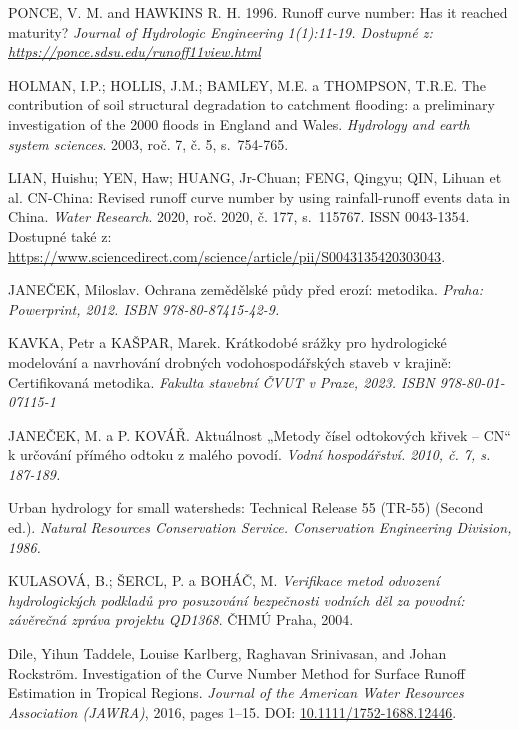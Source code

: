 \documentclass[a4paper,oneside,12pt]{book}
\begin{document}
\begin{thebibliography}{1}
PONCE, V. M. and HAWKINS R. H. 1996. Runoff curve number: Has it reached maturity?
\textit{ Journal of Hydrologic Engineering 1(1):11-19. Dostupné z: \href{https://ponce.sdsu.edu/runoff11view.html}
{https://ponce.sdsu.edu/runoff11view.html}}

HOLMAN, I.P.; HOLLIS, J.M.; BAMLEY, M.E. a THOMPSON, T.R.E. The contribution of soil structural degradation to catchment flooding: a preliminary investigation of the 2000 floods in England and Wales. \textit{Hydrology and earth system sciences}. 2003, roč. 7, č. 5, s.~754-765.

LIAN, Huishu; YEN, Haw; HUANG, Jr-Chuan; FENG, Qingyu; QIN, Lihuan et al. CN-China: Revised runoff curve number by using rainfall-runoff events data in China. \textit{Water Research}. 2020, roč. 2020, č. 177, s.~115767. ISSN 0043-1354. Dostupné také z: \url{https://www.sciencedirect.com/science/article/pii/S0043135420303043}.

JANEČEK, Miloslav. Ochrana zemědělské půdy před erozí: metodika.
\textit{ Praha: Powerprint, 2012. ISBN 978-80-87415-42-9. }

KAVKA, Petr a KAŠPAR, Marek. Krátkodobé srážky pro hydrologické modelování a navrhování drobných vodohospodářských staveb v krajině: Certifikovaná metodika.
\textit{ Fakulta stavební ČVUT v Praze, 2023. ISBN 978-80-01-07115-1}

JANEČEK, M. a P. KOVÁŘ. Aktuálnost „Metody čísel odtokových křivek –
CN“ k určování přímého odtoku z malého povodí.
\textit{ Vodní hospodářství. 2010,
č. 7, s. 187-189.} 

Urban hydrology for small watersheds: Technical Release 55 (TR-55) (Second ed.).
\textit{ Natural Resources Conservation Service. Conservation Engineering Division, 1986.}

KULASOVÁ, B.; ŠERCL, P. a BOHÁČ, M. \textit{Verifikace metod odvození hydrologických podkladů pro posuzování bezpečnosti vodních děl za povodní: závěrečná zpráva projektu QD1368}. ČHMÚ Praha, 2004.



Dile, Yihun Taddele, Louise Karlberg, Raghavan Srinivasan, and Johan Rockström. 
\newblock Investigation of the Curve Number Method for Surface Runoff Estimation in Tropical Regions. 
\newblock \emph{Journal of the American Water Resources Association (JAWRA)}, 2016, pages 1--15. 
\newblock DOI: \href{https://doi.org/10.1111/1752-1688.12446}{10.1111/1752-1688.12446}.


\end{thebibliography}
\end{document}
